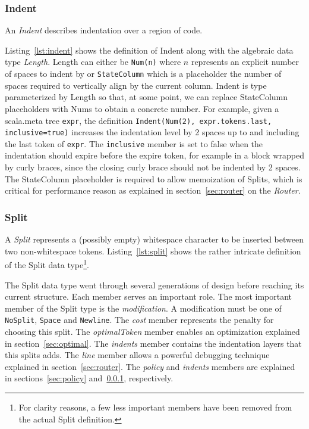 \subsubsection{Indent}\label{sec:indent}
An \emph{Indent} describes indentation over a region of code.

Listing~\ref{lst:indent} shows the definition of Indent along with the algebraic data type \emph{Length}.
Length can either be \texttt{Num(n)} where $n$ represents an explicit number of spaces to indent by or \texttt{StateColumn} which is a placeholder the number of spaces required to vertically align by the current column.
Indent is type parameterized by Length so that, at some point, we can replace StateColumn placeholders with Nums to obtain a concrete number.
For example, given a scala.meta tree \texttt{expr}, the definition \texttt{Indent(Num(2), expr.tokens.last, inclusive=true)}
increases the indentation level by 2 spaces up to and including the last token of \texttt{expr}.
The \texttt{inclusive} member is set to false when the indentation should expire before the expire token, for example in a block wrapped by curly braces, since the closing curly brace should not be indented by 2 spaces.
The StateColumn placeholder is required to allow memoization of Splits, which is critical for performance reason as explained in section~\ref{sec:router} on the \emph{Router}.

\subsubsection{Split}
A \emph{Split} represents a (possibly empty) whitespace character to be inserted between two non-whitespace tokens.
Listing~\ref{lst:split} shows the rather intricate definition of the Split data type\footnote{
  For clarity reasons, a few less important members have been removed from the actual Split definition.}.
\begin{minipage}{\linewidth}
  
\end{minipage}
The Split data type went through several generations of design before reaching its current structure.
Each member serves an important role.
The most important member of the Split type is the \emph{modification}.
A modification must be one of \texttt{NoSplit}, \texttt{Space} and \texttt{Newline}.
The \emph{cost} member represents the penalty for choosing this split.
The \emph{optimalToken} member enables an optimization explained in section~\ref{sec:optimal}.
The \emph{indents} member contains the indentation layers that this splits adds.
The \emph{line} member allows a powerful debugging technique explained in section~\ref{sec:router}.
The \emph{policy} and \emph{indents} members are explained in sections~\ref{sec:policy} and~\ref{sec:indent}, respectively.

